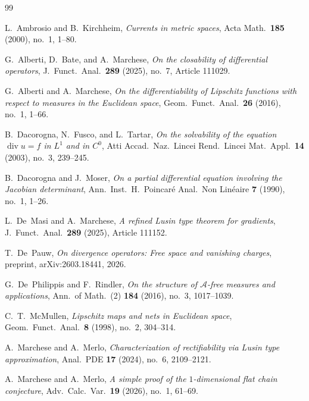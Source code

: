 \documentclass[11pt,a4paper]{article}
\theoremstyle{definition}
\theoremstyle{remark}
\begin{document}
\begin{thebibliography}{99}

L.~Ambrosio and B.~Kirchheim,
\newblock \emph{Currents in metric spaces},
\newblock Acta Math.\ \textbf{185} (2000), no.~1, 1--80.

G.~Alberti, D.~Bate, and A.~Marchese,
\newblock \emph{On the closability of differential operators},
\newblock J.\ Funct.\ Anal.\ \textbf{289} (2025), no.~7, Article 111029.

G.~Alberti and A.~Marchese,
\newblock \emph{On the differentiability of Lipschitz functions with respect to measures in the Euclidean space},
\newblock Geom.\ Funct.\ Anal.\ \textbf{26} (2016), no.~1, 1--66.

B.~Dacorogna, N.~Fusco, and L.~Tartar,
\newblock \emph{On the solvability of the equation $\operatorname{div} u = f$ in $L^1$ and in $C^0$},
\newblock Atti Accad.\ Naz.\ Lincei Rend.\ Lincei Mat.\ Appl.\ \textbf{14} (2003), no.~3, 239--245.

B.~Dacorogna and J.~Moser,
\newblock \emph{On a partial differential equation involving the Jacobian determinant},
\newblock Ann.\ Inst.\ H.\ Poincar\'e Anal.\ Non Lin\'eaire \textbf{7} (1990), no.~1, 1--26.

L.~De~Masi and A.~Marchese,
\newblock \emph{A refined Lusin type theorem for gradients},
\newblock J.\ Funct.\ Anal.\ \textbf{289} (2025), Article 111152.

T.~De~Pauw,
\newblock \emph{On divergence operators: Free space and vanishing charges},
\newblock preprint, arXiv:2603.18441, 2026.

G.~De~Philippis and F.~Rindler,
\newblock \emph{On the structure of $\mathcal A$-free measures and applications},
\newblock Ann.\ of Math.\ (2) \textbf{184} (2016), no.~3, 1017--1039.

C.~T.~McMullen,
\newblock \emph{Lipschitz maps and nets in Euclidean space},
\newblock Geom.\ Funct.\ Anal.\ \textbf{8} (1998), no.~2, 304--314.

A.~Marchese and A.~Merlo,
\newblock \emph{Characterization of rectifiability via Lusin type approximation},
\newblock Anal.\ PDE \textbf{17} (2024), no.~6, 2109--2121.

A.~Marchese and A.~Merlo,
\newblock \emph{A simple proof of the $1$-dimensional flat chain conjecture},
\newblock Adv.\ Calc.\ Var.\ \textbf{19} (2026), no.~1, 61--69.


\end{thebibliography}
\end{document}

